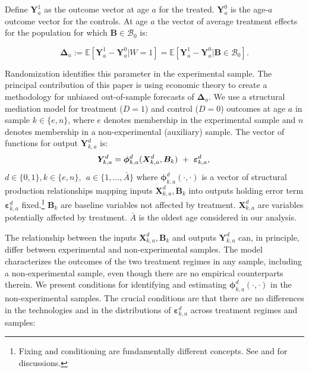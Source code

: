 Define $\bm{Y}^1_a$ as the outcome vector at age $a$ for the treated. $\bm{Y}^0_a$ is the age-$a$ outcome vector for the controls. At age $a$ the vector of average treatment effects for the population for which $\bm{B}\in\mathcal{B}_0$ is:

\begin{equation}
\bm{\Delta}_a  := \mathbb{E} \left[ \bm{Y}^1_a - \bm{Y}^0_a | W = 1 \right] = \mathbb{E} \left[\bm{Y}^1_a - \bm{Y}^0_{a} | \bm{B} \in \mathcal{B}_0 \right]. \label{eq:mainte}
\end{equation}

Randomization identifies this parameter in the experimental sample. The principal contribution of this paper is using economic theory to create a methodology for unbiased out-of-sample forecasts of $\bm{\Delta}_a$. We use a structural mediation model for treatment ($D=1$) and control ($D=0$) outcomes at age $a$ in sample $k \in \{e,n\}$, where $e$ denotes membership in the experimental sample and $n$ denotes membership in a non-experimental (auxiliary) sample. The vector of functions for output $\bm{Y}^d_{k,a}$ is:
\begin{equation}
\bm{Y}^d_{k,a} = \bm{\phi}^d_{k,a} (\bm{X}^d_{k,a}, \bm{B}_k) \ + \ \bm{\varepsilon}^d_{k,a},  \label{eq:outcome} \\
\end{equation}
$d \in\{0,1\},  k\in\{e,n\}, \ \ a\in\{1,\dots,\bar{A}\}$ where $\bm{\phi}^d_{k,a}\left( \cdot, \cdot \right)$ is a vector of structural production relationships mapping inputs $\bm{X}^d_{k,a}, \bm{B}_k$ into outputs holding error term $\bm{\varepsilon}^d_{k,a}$ fixed.\footnote{Fixing and conditioning are fundamentally different concepts. See \cite{Haavelmo_1943_Econometrica} and \citet{Heckman_Pinto_2015_EconometTheory} for discussions.} $ \bm{B}_k$ are baseline variables not affected by treatment. $\bm{X}^d_{k,a}$ are variables potentially affected by treatment. $\bar{A}$ is the oldest age considered in our analysis.

The relationship between the inputs $\bm{X}^d_{k,a}, \bm{B}_k$ and outputs $\bm{Y}^d_{k,a}$ can, in principle, differ between experimental and non-experimental samples. The model characterizes the outcomes of the two treatment regimes in any sample, including a non-experimental sample, even though there are no empirical counterparts therein. We present conditions for identifying and estimating $\bm{\phi}^d_{k,a}\left( \cdot, \cdot \right)$ in the non-experimental samples. The crucial conditions are that there are no differences in the technologies and in the distributions of $\bm{\varepsilon}_{k,a}^d$ across treatment regimes and samples:

